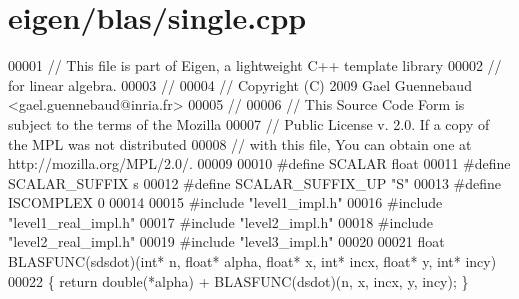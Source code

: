 \hypertarget{eigen_2blas_2single_8cpp_source}{}\section{eigen/blas/single.cpp}
\label{eigen_2blas_2single_8cpp_source}

\begin{DoxyCode}
00001 \textcolor{comment}{// This file is part of Eigen, a lightweight C++ template library}
00002 \textcolor{comment}{// for linear algebra.}
00003 \textcolor{comment}{//}
00004 \textcolor{comment}{// Copyright (C) 2009 Gael Guennebaud <gael.guennebaud@inria.fr>}
00005 \textcolor{comment}{//}
00006 \textcolor{comment}{// This Source Code Form is subject to the terms of the Mozilla}
00007 \textcolor{comment}{// Public License v. 2.0. If a copy of the MPL was not distributed}
00008 \textcolor{comment}{// with this file, You can obtain one at http://mozilla.org/MPL/2.0/.}
00009 
00010 \textcolor{preprocessor}{#define SCALAR        float}
00011 \textcolor{preprocessor}{#define SCALAR\_SUFFIX s}
00012 \textcolor{preprocessor}{#define SCALAR\_SUFFIX\_UP "S"}
00013 \textcolor{preprocessor}{#define ISCOMPLEX     0}
00014 
00015 \textcolor{preprocessor}{#include "level1\_impl.h"}
00016 \textcolor{preprocessor}{#include "level1\_real\_impl.h"}
00017 \textcolor{preprocessor}{#include "level2\_impl.h"}
00018 \textcolor{preprocessor}{#include "level2\_real\_impl.h"}
00019 \textcolor{preprocessor}{#include "level3\_impl.h"}
00020 
00021 \textcolor{keywordtype}{float} BLASFUNC(sdsdot)(\textcolor{keywordtype}{int}* n, \textcolor{keywordtype}{float}* alpha, \textcolor{keywordtype}{float}* x, \textcolor{keywordtype}{int}* incx, \textcolor{keywordtype}{float}* y, \textcolor{keywordtype}{int}* incy)
00022 \{ \textcolor{keywordflow}{return} double(*alpha) + BLASFUNC(dsdot)(n, x, incx, y, incy); \}
\end{DoxyCode}
